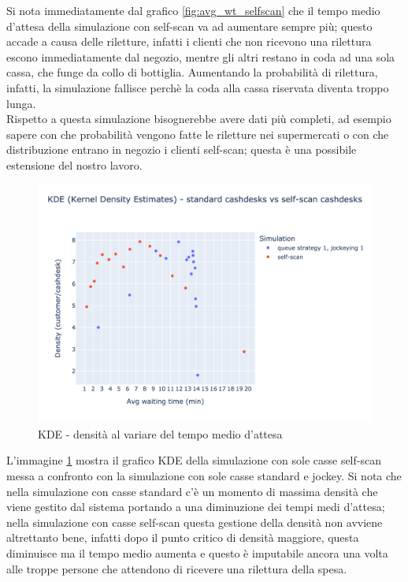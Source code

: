 Si nota immediatamente dal grafico \ref{fig:avg_wt_selfscan} che il tempo medio d'attesa della simulazione con self-scan va ad aumentare sempre più; questo accade a causa delle riletture, infatti i clienti che non ricevono una rilettura escono immediatamente dal negozio, mentre gli altri restano in coda ad una sola cassa, che funge da collo di bottiglia. Aumentando la probabilità di rilettura, infatti, la simulazione fallisce perchè la coda alla cassa riservata diventa troppo lunga. \\
Rispetto a questa simulazione bisognerebbe avere dati più completi, ad esempio sapere con che probabilità vengono fatte le riletture nei supermercati o con che distribuzione entrano in negozio i clienti self-scan; questa è una possibile estensione del nostro lavoro.

\begin{figure}[H]
	\centering
	\includegraphics[width=12cm]{"images/results/kde_self_scan.png"}
	
	\caption{KDE - densità al variare del tempo medio d'attesa}
	\label{fig:kde_self_scan}
\end{figure}

L'immagine \ref{fig:kde_self_scan} mostra il grafico KDE della simulazione con sole casse self-scan messa a confronto con la simulazione con sole casse standard e jockey. Si nota che nella simulazione con casse standard c'è un momento di massima densità che viene gestito dal sistema portando a una diminuzione dei tempi medi d'attesa; nella simulazione con casse self-scan questa gestione della densità non avviene altrettanto bene, infatti dopo il punto critico di densità maggiore, questa diminuisce ma il tempo medio aumenta e questo è imputabile ancora una volta alle troppe persone che attendono di ricevere una rilettura della spesa.


